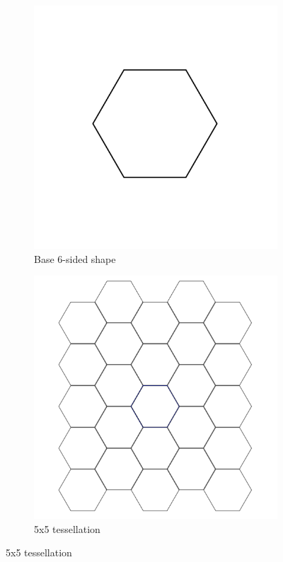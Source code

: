 \documentclass[12pt,letterpaper]{article}
\begin{document}
\begin{figure}[H]
    \begin{center}
        \caption{Tesselation of a hexagon, also known as a honeycomb $\{6,3\}$}
        \label{fig:hex}
        \begin{subfigure}[b]{.3\linewidth}
            \includegraphics[width=\linewidth]{base-hex}
            \caption{Base 6-sided shape}
        \end{subfigure}
        \begin{subfigure}[b]{.3\linewidth}
            \includegraphics[width=\linewidth]{tes-hex}
            \caption{5x5 tessellation}
        \end{subfigure}
    \end{center}
\end{figure}
\end{document}
